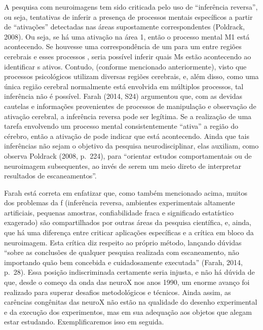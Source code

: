 A pesquisa com neuroimagens tem sido criticada pelo uso de ``inferência
reversa'', ou seja, tentativas de inferir a presença de processos
mentais específicos a partir de ``ativações'' detectadas nas áreas
supostamente correspondentes (Poldrack, 2008). Ou seja, se há uma
ativação na área 1, então o processo mental M1 está acontecendo. Se
houvesse uma correspondência de um para um entre regiões cerebrais  e
esses processos , seria possível inferir quais Ms estão acontecendo ao
identificar s ativos. Contudo, (conforme mencionado anteriormente),
visto que processos psicológicos utilizam diversas regiões cerebrais, e,
além disso, como uma única região cerebral normalmente está envolvida em
múltiplos processos, tal inferência não é possível. Farah (2014, S24)
argumentou que, com as devidas cautelas e informações provenientes de
processos de manipulação e observação de ativação cerebral, a inferência
reversa pode ser legítima. Se a realização de uma tarefa  envolvendo um
processo mental  consistentemente ``ativa'' a região  do cérebro,
então a ativação de  pode indicar que  está acontecendo. Ainda que
tais inferências não sejam o objetivo da pesquisa neurodisciplinar, elas
auxiliam, como observa Poldrack (2008, p.~224), para ``orientar estudos
comportamentais ou de neuroimagem subsequentes, ao invés de serem um
meio direto de interpretar resultados de escaneamentos''.

Farah está correta em enfatizar que, como também mencionado acima, muitos dos
problemas da f (inferência reversa, ambientes experimentais altamente
artificiais, pequenas amostras, confiabilidade
fraca e significado estatístico exagerado) são compartilhados por outras
áreas da pesquisa científica, e, ainda, que há uma diferença entre
criticar aplicações específicas e a crítica em bloco da
neuroimagem. Esta crítica diz respeito ao próprio método, lançando
dúvidas ``sobre as conclusões de qualquer pesquisa realizada com
escaneamento, não importando quão bem concebida e cuidadosamente
executada'' (Farah, 2014, p.~28). Essa posição indiscriminada certamente
seria injusta, e não há dúvida de que, desde o começo da onda das neuroX
nos anos 1990, um enorme avanço foi realizado para superar desafios
metodológicos e técnicos. Ainda assim, as carências congênitas das
neuroX não estão na qualidade do desenho experimental e da execução dos experimentos,
mas em sua adequação aos objetos que alegam estar estudando.
Exemplificaremos isso em seguida.

